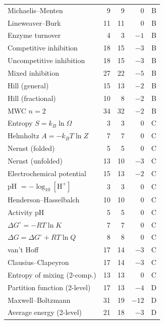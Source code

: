 \documentclass[12pt,a4paper]{article}
\theoremstyle{definition}
\begin{document}
\begin{longtable}{@{}p{5.2cm}rrrc@{}}
Michaelis--Menten                       & 9  & 9  & $0$  & B \\
Lineweaver--Burk                        & 11 & 11 & $0$  & B \\
Enzyme turnover                         & 4  & 3  & $-1$ & B \\
Competitive inhibition                  & 18 & 15 & $-3$ & B \\
Uncompetitive inhibition                & 18 & 15 & $-3$ & B \\
Mixed inhibition                        & 27 & 22 & $-5$ & B \\
Hill (general)                          & 15 & 13 & $-2$ & B \\
Hill (fractional)                       & 10 & 8  & $-2$ & B \\
MWC $n=2$                               & 34 & 32 & $-2$ & B \\
\midrule
Entropy $S=k_B\ln\Omega$                & 3  & 3  & $0$  & C \\
Helmholtz $A=-k_BT\ln Z$               & 7  & 7  & $0$  & C \\
Nernst (folded)                         & 5  & 5  & $0$  & C \\
Nernst (unfolded)                       & 13 & 10 & $-3$ & C \\
Electrochemical potential               & 15 & 13 & $-2$ & C \\
pH $= -\log_{10}[\mathrm{H}^+]$        & 3  & 3  & $0$  & C \\
Henderson--Hasselbalch                  & 10 & 10 & $0$  & C \\
Activity pH                             & 5  & 5  & $0$  & C \\
$\Delta G^\circ = -RT\ln K$             & 7  & 7  & $0$  & C \\
$\Delta G = \Delta G^\circ + RT\ln Q$   & 8  & 8  & $0$  & C \\
van't Hoff                              & 17 & 14 & $-3$ & C \\
Clausius--Clapeyron                     & 17 & 14 & $-3$ & C \\
Entropy of mixing (2-comp.)             & 13 & 13 & $0$  & C \\
\midrule
Partition function (2-level)            & 17 & 13 & $-4$ & D \\
Maxwell--Boltzmann                      & 31 & 19 & $-12$& D \\
Average energy (2-level)                & 21 & 18 & $-3$ & D \\

\end{longtable}
\end{document}
